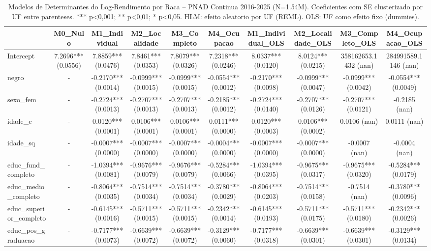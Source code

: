 \begin{table}
\caption{Modelos de Determinantes do Log-Rendimento por Raca -- PNAD Continua 2016-2025 (N=1.54M). Coeficientes com SE clusterizado por UF entre parenteses. *** p<0,001; ** p<0,01; * p<0,05. HLM: efeito aleatorio por UF (REML). OLS: UF como efeito fixo (dummies).}
\label{tab:hlm_serie_completa}
\begin{tabular}{lccccccccc}
\toprule
 & M0_Nulo & M1_Individual & M2_Localidade & M3_Completo & M4_Ocupacao & M1_Individual_OLS & M2_Localidade_OLS & M3_Completo_OLS & M4_Ocupacao_OLS \\
\midrule
Intercept & 7.2696*** (0.0556) & 7.8859*** (0.0476) & 7.8461*** (0.0353) & 7.8079*** (0.0326) & 7.2318*** (0.0246) & 8.0337*** (0.0120) & 8.0124*** (0.0215) & 358162653.1432 (nan) & 284991589.1146 (nan) \\
negro & - & -0.2170*** (0.0014) & -0.0999*** (0.0015) & -0.0999*** (0.0015) & -0.0554*** (0.0012) & -0.2170*** (0.0098) & -0.0999*** (0.0047) & -0.0999*** (0.0042) & -0.0554*** (0.0049) \\
sexo_fem & - & -0.2724*** (0.0013) & -0.2707*** (0.0013) & -0.2707*** (0.0013) & -0.2185*** (0.0012) & -0.2724*** (0.0140) & -0.2707*** (0.0126) & -0.2707*** (0.0121) & -0.2185 (nan) \\
idade_c & - & 0.0120*** (0.0001) & 0.0106*** (0.0001) & 0.0106*** (0.0001) & 0.0111*** (0.0000) & 0.0120*** (0.0003) & 0.0106*** (0.0002) & 0.0106 (nan) & 0.0111 (nan) \\
idade_sq & - & -0.0007*** (0.0000) & -0.0007*** (0.0000) & -0.0007*** (0.0000) & -0.0004*** (0.0000) & -0.0007*** (0.0000) & -0.0007*** (0.0000) & -0.0007 (nan) & -0.0004 (nan) \\
educ_fund_completo & - & -1.0394*** (0.0081) & -0.9676*** (0.0079) & -0.9676*** (0.0079) & -0.5284*** (0.0066) & -1.0394*** (0.0395) & -0.9675*** (0.0317) & -0.9675*** (0.0320) & -0.5284*** (0.0179) \\
educ_medio_completo & - & -0.8064*** (0.0035) & -0.7514*** (0.0034) & -0.7514*** (0.0034) & -0.3780*** (0.0029) & -0.8064*** (0.0203) & -0.7514*** (0.0158) & -0.7514 (nan) & -0.3780*** (0.0096) \\
educ_superior_completo & - & -0.6145*** (0.0016) & -0.5711*** (0.0015) & -0.5711*** (0.0015) & -0.2342*** (0.0014) & -0.6145*** (0.0193) & -0.5711*** (0.0175) & -0.5711*** (0.0180) & -0.2342*** (0.0026) \\
educ_pos_graduacao & - & -0.7177*** (0.0073) & -0.6639*** (0.0072) & -0.6639*** (0.0072) & -0.3129*** (0.0060) & -0.7177*** (0.0318) & -0.6639*** (0.0301) & -0.6639*** (0.0301) & -0.3129*** (0.0134) \\

\end{tabular}
\end{table}
